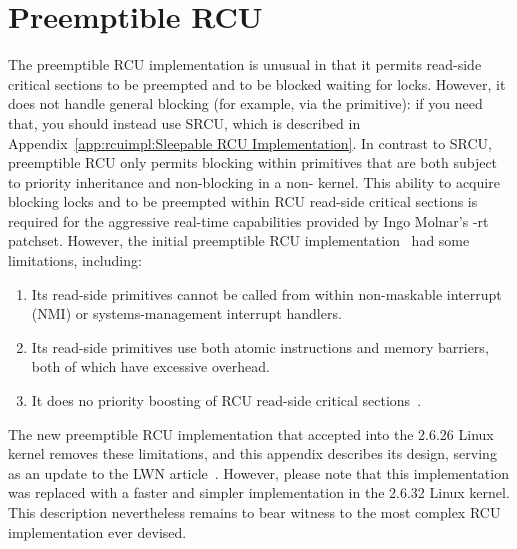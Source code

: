 
\section{Preemptible RCU}
\label{app:rcuimpl:Preemptible RCU}

The preemptible RCU implementation is unusual in that
it permits read-side critical
sections to be preempted and to be blocked waiting for locks.
However, it does not handle general blocking
(for example, via the  primitive):
if you need that, you should instead use SRCU, which is described in
Appendix~\ref{app:rcuimpl:Sleepable RCU Implementation}.
In contrast to SRCU,
preemptible RCU only permits blocking within primitives that are
both subject to priority inheritance and non-blocking in a
non- kernel.
This ability to acquire blocking locks and to be preempted within
RCU read-side critical sections is required for the aggressive real-time
capabilities provided by Ingo Molnar's -rt patchset.
However, the initial preemptible RCU implementation~\cite{PaulMcKenney2005d}
had some limitations, including:

\begin{enumerate}
\item	Its read-side primitives cannot be called from within
	non-maskable interrupt (NMI) or systems-management interrupt
	handlers.
\item	Its read-side primitives use both atomic instructions and
	memory barriers, both of which have excessive overhead.
\item	It does no priority boosting of RCU read-side critical
	sections~\cite{PaulEMcKenney2007BoostRCU}.
\end{enumerate}

The new preemptible RCU implementation that accepted into the 2.6.26
Linux kernel
removes these limitations, and this appendix describes its design,
serving as an update to the LWN article~\cite{PaulEMcKenney2007PreemptibleRCU}.
However, please note that this implementation was replaced with a faster
and simpler implementation in the 2.6.32 Linux kernel.
This description nevertheless remains to bear witness to the most complex
RCU implementation ever devised.


